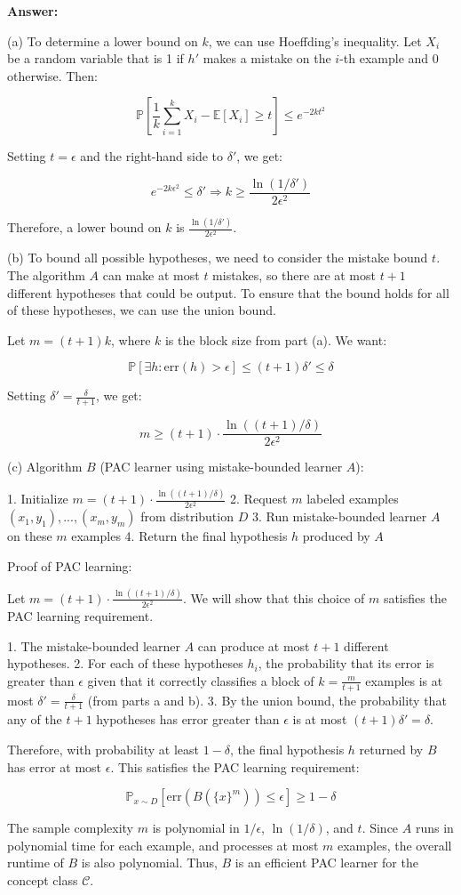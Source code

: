 \documentclass{article}
\begin{document}
\textbf{Answer:}

(a) To determine a lower bound on $k$, we can use Hoeffding's inequality. Let $X_i$ be a random variable that is 1 if $h'$ makes a mistake on the $i$-th example and 0 otherwise. Then:

\[
\mathbb{P}[\frac{1}{k}\sum_{i=1}^k X_i - \mathbb{E}[X_i] \geq t] \leq e^{-2kt^2}
\]

Setting $t = \epsilon$ and the right-hand side to $\delta'$, we get:

\[
e^{-2k\epsilon^2} \leq \delta' \Rightarrow k \geq \frac{\ln(1/\delta')}{2\epsilon^2}
\]

Therefore, a lower bound on $k$ is $\frac{\ln(1/\delta')}{2\epsilon^2}$.

(b) To bound all possible hypotheses, we need to consider the mistake bound $t$. The algorithm $A$ can make at most $t$ mistakes, so there are at most $t+1$ different hypotheses that could be output. To ensure that the bound holds for all of these hypotheses, we can use the union bound.

Let $m = (t+1)k$, where $k$ is the block size from part (a). We want:

\[
\mathbb{P}[\exists h : \text{err}(h) > \epsilon] \leq (t+1)\delta' \leq \delta
\]

Setting $\delta' = \frac{\delta}{t+1}$, we get:

\[
m \geq (t+1) \cdot \frac{\ln((t+1)/\delta)}{2\epsilon^2}
\]

(c) Algorithm $B$ (PAC learner using mistake-bounded learner $A$):

1. Initialize $m = (t+1) \cdot \frac{\ln((t+1)/\delta)}{2\epsilon^2}$
2. Request $m$ labeled examples $(x_1, y_1), ..., (x_m, y_m)$ from distribution $D$
3. Run mistake-bounded learner $A$ on these $m$ examples
4. Return the final hypothesis $h$ produced by $A$

Proof of PAC learning:

Let $m = (t+1) \cdot \frac{\ln((t+1)/\delta)}{2\epsilon^2}$. We will show that this choice of $m$ satisfies the PAC learning requirement.

1. The mistake-bounded learner $A$ can produce at most $t+1$ different hypotheses.
2. For each of these hypotheses $h_i$, the probability that its error is greater than $\epsilon$ given that it correctly classifies a block of $k = \frac{m}{t+1}$ examples is at most $\delta' = \frac{\delta}{t+1}$ (from parts a and b).
3. By the union bound, the probability that any of the $t+1$ hypotheses has error greater than $\epsilon$ is at most $(t+1)\delta' = \delta$.

Therefore, with probability at least $1-\delta$, the final hypothesis $h$ returned by $B$ has error at most $\epsilon$. This satisfies the PAC learning requirement:

\[
\mathbb{P}_{x\sim D}[\text{err}(B(\{x\}^m)) \leq \epsilon] \geq 1 - \delta
\]

The sample complexity $m$ is polynomial in $1/\epsilon$, $\ln(1/\delta)$, and $t$. Since $A$ runs in polynomial time for each example, and processes at most $m$ examples, the overall runtime of $B$ is also polynomial. Thus, $B$ is an efficient PAC learner for the concept class $\mathcal{C}$.
\end{document}
